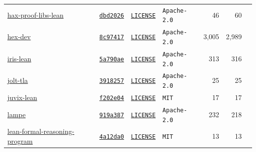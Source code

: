 \documentclass{article}
\begin{document}
\begin{table}[p]
\begin{tabular}{lllp{2.9cm}rrl}
    \href{https://github.com/cryspen/hax}{hax-proof-libs-lean} & \href{https://github.com/cryspen/hax/tree/dbd2026cc871063a455da37f88ade8f4167271bc}{\texttt{dbd2026}} & \href{https://github.com/cryspen/hax/blob/dbd2026cc871063a455da37f88ade8f4167271bc/LICENSE}{\texttt{LICENSE}} & \texttt{Apache-2.0} & 46 & 60 &  \\
    \href{https://github.com/kim-em/hex-dev}{hex-dev} & \href{https://github.com/kim-em/hex-dev/tree/8c974172dea442251aead59be634e19753c37b2f}{\texttt{8c97417}} & \href{https://github.com/kim-em/hex-dev/blob/8c974172dea442251aead59be634e19753c37b2f/LICENSE}{\texttt{LICENSE}} & \texttt{Apache-2.0} & 3{,}005 & 2{,}989 &  \\
    \href{https://github.com/leanprover-community/iris-lean}{iris-lean} & \href{https://github.com/leanprover-community/iris-lean/tree/5a790aed0dcad30219aa218c88a7fd306c092fae}{\texttt{5a790ae}} & \href{https://github.com/leanprover-community/iris-lean/blob/5a790aed0dcad30219aa218c88a7fd306c092fae/LICENSE}{\texttt{LICENSE}} & \texttt{Apache-2.0} & 313 & 316 &  \\
    \href{https://github.com/CharlesHoskinson/jolt-tla}{jolt-tla} & \href{https://github.com/CharlesHoskinson/jolt-tla/tree/3918257edd8333d79e21d813a2fa70761aba538f}{\texttt{3918257}} & \href{https://github.com/CharlesHoskinson/jolt-tla/blob/3918257edd8333d79e21d813a2fa70761aba538f/LICENSE}{\texttt{LICENSE}} & \texttt{Apache-2.0} & 25 & 25 &  \\
    \href{https://github.com/anoma/juvix-lean}{juvix-lean} & \href{https://github.com/anoma/juvix-lean/tree/f202e04219a84ce8f56b2c3fffa3409237c5daea}{\texttt{f202e04}} & \href{https://github.com/anoma/juvix-lean/blob/f202e04219a84ce8f56b2c3fffa3409237c5daea/LICENSE}{\texttt{LICENSE}} & \texttt{MIT} & 17 & 17 &  \\
    \href{https://github.com/reilabs/lampe}{lampe} & \href{https://github.com/reilabs/lampe/tree/919a38712d22d05fc83e59af17ef57077abda1e0}{\texttt{919a387}} & \href{https://github.com/reilabs/lampe/blob/919a38712d22d05fc83e59af17ef57077abda1e0/LICENSE}{\texttt{LICENSE}} & \texttt{Apache-2.0} & 232 & 218 &  \\
    \href{https://github.com/andaraiwin/lean-formal-reasoning-program}{lean-formal-reasoning-program} & \href{https://github.com/andaraiwin/lean-formal-reasoning-program/tree/4a12da01571e50e52075d52808f76e029be0e7c9}{\texttt{4a12da0}} & \href{https://github.com/andaraiwin/lean-formal-reasoning-program/blob/4a12da01571e50e52075d52808f76e029be0e7c9/LICENSE}{\texttt{LICENSE}} & \texttt{MIT} & 13 & 13 &  \\

\end{tabular}
\end{table}
\end{document}
